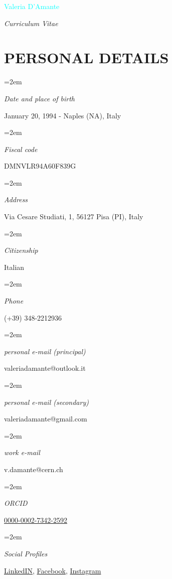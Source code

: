\documentclass[paper=a4,fontsize=12pt]{article} %
\newlength{\spacebox}
\newcommand{\MyName}[1]{ %
	\Huge \hfill \textcolor{cyan}{#1}
	\par \normalsize \normalfont}
\newcommand{\MySlogan}[1]{ %
	\large \hfill \textit{#1}
	\par \normalsize \normalfont}
\newcommand{\NewPart}[1]{\section*{\uppercase{#1}}}
\newcommand{\PersonalEntry}[2]{
	\noindent\hangindent=2em\hangafter=0 %
	\vspace{0.7em}
	\parbox{\spacebox}{        %
		\footnotesize{\textit{#1}}}		       %
	\hspace{1.3em} #2 \par}    %
\begin{document}
	\MyName{Valeria D'Amante}
	\MySlogan{Curriculum Vitae}
	
	
	

	\NewPart{Personal details}
	\PersonalEntry{Date and place of birth}{January 20, 1994 - Naples (NA), Italy}
	\PersonalEntry{Fiscal code}{DMNVLR94A60F839G}
	\PersonalEntry{Address}{Via Cesare Studiati, 1, 56127 Pisa (PI), Italy}
	\PersonalEntry{Citizenship}{Italian}
	\PersonalEntry{Phone}{(+39) 348-2212936}
	\PersonalEntry{personal e-mail (principal)}{valeriadamante@outlook.it}
	\PersonalEntry{personal e-mail (secondary)}{valeriadamante@gmail.com}
	\PersonalEntry{work e-mail}{v.damante@cern.ch} 
	\PersonalEntry{ORCID}{\href{https://orcid.org/0000-0002-7342-2592}{0000-0002-7342-2592}} 
	\PersonalEntry{Social Profiles}{\href{https://www.linkedin.com/in/valeria-d-amante-44943820b/}{LinkedIN}, \href{https://www.facebook.com/Valy.20/}{Facebook}, \href{https://www.instagram.com/valeriadamante/}{Instagram}}
\end{document}
